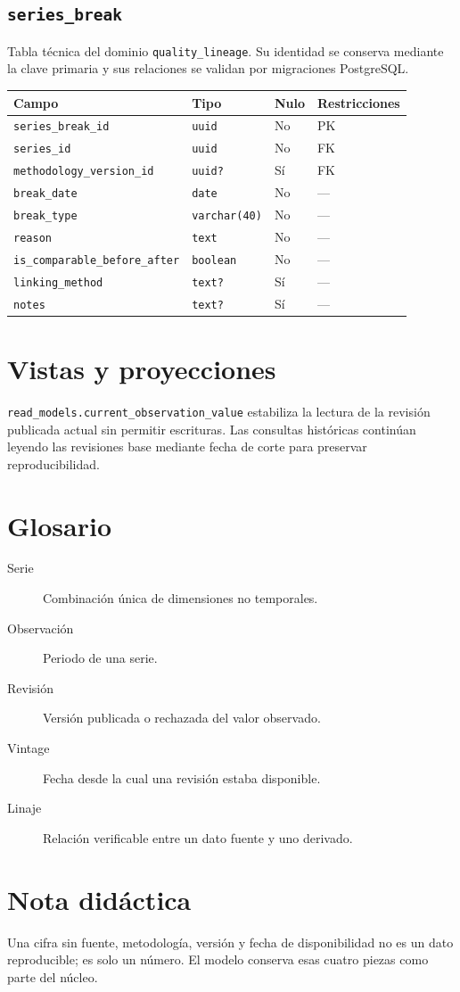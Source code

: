 \documentclass[11pt]{article}
\begin{document}
\subsection{\texttt{series\_break}}
Tabla técnica del dominio \texttt{quality\_lineage}. Su identidad se conserva mediante la clave primaria y sus relaciones se validan por migraciones PostgreSQL.
\begin{longtable}{>{\raggedright\arraybackslash}p{} p{} p{} p{}}
\toprule Campo & Tipo & Nulo & Restricciones \\ \midrule\endhead
\texttt{series\_break\_id} & \texttt{uuid} & No & PK \\
\texttt{series\_id} & \texttt{uuid} & No & FK \\
\texttt{methodology\_version\_id} & \texttt{uuid?} & Sí & FK \\
\texttt{break\_date} & \texttt{date} & No & --- \\
\texttt{break\_type} & \texttt{varchar(40)} & No & --- \\
\texttt{reason} & \texttt{text} & No & --- \\
\texttt{is\_comparable\_before\_after} & \texttt{boolean} & No & --- \\
\texttt{linking\_method} & \texttt{text?} & Sí & --- \\
\texttt{notes} & \texttt{text?} & Sí & --- \\
\bottomrule\end{longtable}
\section{Vistas y proyecciones}
\texttt{read\_models.current\_observation\_value} estabiliza la lectura de la revisión publicada actual sin permitir escrituras. Las consultas históricas continúan leyendo las revisiones base mediante fecha de corte para preservar reproducibilidad.
\section{Glosario}
\begin{description}
\item[Serie] Combinación única de dimensiones no temporales.
\item[Observación] Periodo de una serie.
\item[Revisión] Versión publicada o rechazada del valor observado.
\item[Vintage] Fecha desde la cual una revisión estaba disponible.
\item[Linaje] Relación verificable entre un dato fuente y uno derivado.
\end{description}
\section{Nota didáctica}
Una cifra sin fuente, metodología, versión y fecha de disponibilidad no es un dato reproducible; es solo un número. El modelo conserva esas cuatro piezas como parte del núcleo.
\end{document}
